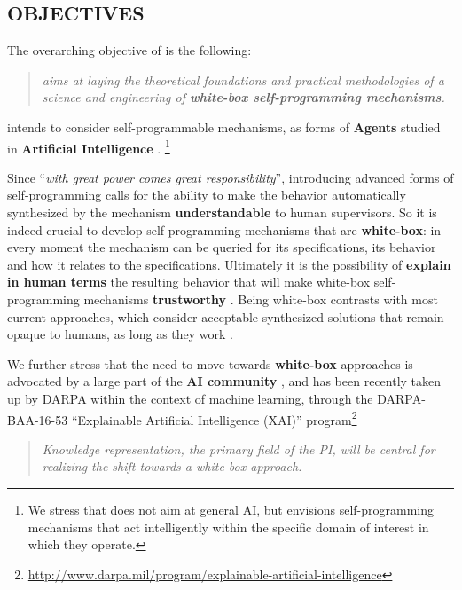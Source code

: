 \subsection{OBJECTIVES}

\vspace{-1ex}

The overarching objective of \project is the following:

\begin{quote}\textit{
\project aims at laying the theoretical foundations and practical
methodologies of a science and engineering of \textbf{white-box self-programming mechanisms}. 
}
\end{quote}
\project intends to consider self-programmable mechanisms, as forms
of \textbf{Agents} studied in \textbf{Artificial Intelligence}
\cite{Reiter01,Wooldridge09}. \footnote{We stress that \project does
  not aim at general AI, but envisions self-programming mechanisms
  that act intelligently within the specific domain of interest in
  which they operate.}

Since ``\emph{with great power comes great responsibility}'',
introducing advanced forms of self-programming calls for the ability
to make the behavior automatically synthesized by the mechanism
\textbf{understandable} to human supervisors.
So it is indeed crucial to develop self-programming mechanisms that are \textbf{white-box}: in every moment the
mechanism can be queried for its specifications, its behavior and how
it relates to the specifications. Ultimately it is the possibility of \textbf{explain in human terms}
the resulting behavior that will make white-box self-programming mechanisms  \textbf{trustworthy} \cite{CaDa10,Neumann17}.
%
Being white-box contrasts with most current approaches, which consider
acceptable synthesized solutions that remain opaque to humans, as long
as they work \cite{MnihKSGAWR13,SilverHMGSDSAPL16}.

We further stress that the need to move towards \textbf{white-box}
approaches is advocated by a large part of the \textbf{AI community}
\cite{RussellDT15}, and has been recently taken up by DARPA within the
context of machine learning, through the DARPA-BAA-16-53 ``Explainable
Artificial Intelligence (XAI)''
program\footnote{\url{http://www.darpa.mil/program/explainable-artificial-intelligence}}

\begin{quote}{\it
Knowledge representation, the primary field of the PI, will be central for realizing the shift towards a white-box approach.}
\end{quote}



